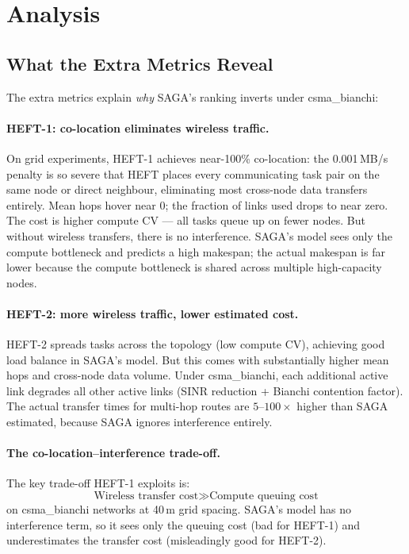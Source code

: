 \documentclass[11pt]{article}
\begin{document}
\section{Analysis}

\subsection{What the Extra Metrics Reveal}

The extra metrics explain \emph{why} SAGA's ranking inverts under csma\_bianchi:

\paragraph{HEFT-1: co-location eliminates wireless traffic.}
On grid experiments, HEFT-1 achieves near-100\% co-location: the 0.001\,MB/s
penalty is so severe that HEFT places every communicating task pair on the same
node or direct neighbour, eliminating most cross-node data transfers entirely.
Mean hops hover near 0; the fraction of links used drops to near zero.
The cost is higher compute CV — all tasks queue up on fewer nodes.  But without
wireless transfers, there is no interference.  SAGA's model sees only the compute
bottleneck and predicts a high makespan; the actual makespan is far lower because
the compute bottleneck is shared across multiple high-capacity nodes.

\paragraph{HEFT-2: more wireless traffic, lower estimated cost.}
HEFT-2 spreads tasks across the topology (low compute CV), achieving good load
balance in SAGA's model.  But this comes with substantially higher mean hops and
cross-node data volume.  Under csma\_bianchi, each additional active link degrades
all other active links (SINR reduction + Bianchi contention factor).  The actual
transfer times for multi-hop routes are $5\text{--}100\times$ higher than SAGA estimated,
because SAGA ignores interference entirely.

\paragraph{The co-location--interference trade-off.}
The key trade-off HEFT-1 exploits is:
\[
  \text{Wireless transfer cost} \gg \text{Compute queuing cost}
\]
on csma\_bianchi networks at 40\,m grid spacing.  SAGA's model has no interference
term, so it sees only the queuing cost (bad for HEFT-1) and underestimates the
transfer cost (misleadingly good for HEFT-2).
\end{document}
